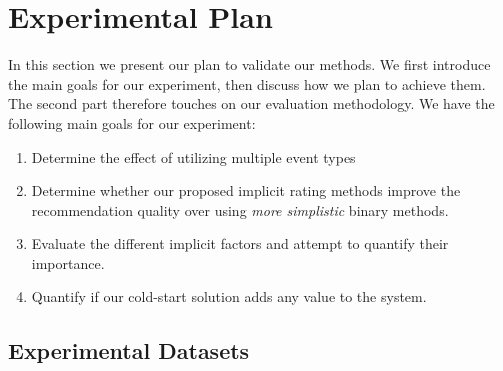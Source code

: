 \clearpage
\section{Experimental Plan}
\label{sec:experimental-plan}


In this section we present our plan to validate our methods. We first introduce
the main goals for our experiment, then discuss how we plan to achieve them.
The second part therefore touches on our evaluation methodology.
We have the following main goals for our experiment:

\begin{enumerate}
	\item Determine the effect of utilizing multiple event types
	\item Determine whether our proposed implicit rating methods improve the recommendation quality over
		  		  using \emph{more simplistic} binary methods.
	\item Evaluate the different implicit factors and attempt to quantify their importance.
	\item Quantify if our cold-start solution adds any value to the system.
\end{enumerate}

\subsection{Experimental Datasets}

